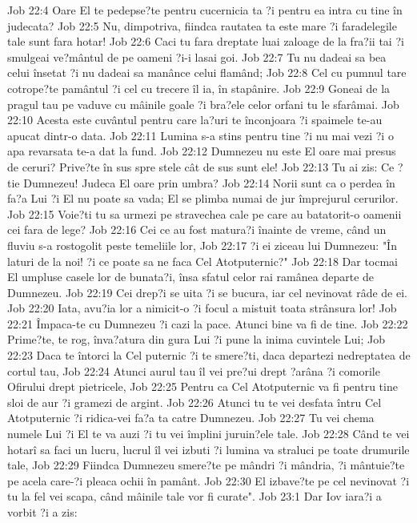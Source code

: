 Job 22:4  Oare El te pedepse?te pentru cucernicia ta ?i pentru ea intra cu tine în judecata?
Job 22:5  Nu, dimpotriva, fiindca rautatea ta este mare ?i faradelegile tale sunt fara hotar!
Job 22:6  Caci tu fara dreptate luai zaloage de la fra?ii tai ?i smulgeai ve?mântul de pe oameni ?i-i lasai goi.
Job 22:7  Tu nu dadeai sa bea celui însetat ?i nu dadeai sa manânce celui flamând;
Job 22:8  Cel cu pumnul tare cotrope?te pamântul ?i cel cu trecere îl ia, în stapânire.
Job 22:9  Goneai de la pragul tau pe vaduve cu mâinile goale ?i bra?ele celor orfani tu le sfarâmai.
Job 22:10  Acesta este cuvântul pentru care la?uri te înconjoara ?i spaimele te-au apucat dintr-o data.
Job 22:11  Lumina s-a stins pentru tine ?i nu mai vezi ?i o apa revarsata te-a dat la fund.
Job 22:12  Dumnezeu nu este El oare mai presus de ceruri? Prive?te în sus spre stele cât de sus sunt ele!
Job 22:13  Tu ai zis: Ce ?tie Dumnezeu! Judeca El oare prin umbra?
Job 22:14  Norii sunt ca o perdea în fa?a Lui ?i El nu poate sa vada; El se plimba numai de jur împrejurul cerurilor.
Job 22:15  Voie?ti tu sa urmezi pe stravechea cale pe care au batatorit-o oamenii cei fara de lege?
Job 22:16  Cei ce au fost matura?i înainte de vreme, când un fluviu s-a rostogolit peste temeliile lor,
Job 22:17  ?i ei ziceau lui Dumnezeu: "În laturi de la noi! ?i ce poate sa ne faca Cel Atotputernic?"
Job 22:18  Dar tocmai El umpluse casele lor de bunata?i, însa sfatul celor rai ramânea departe de Dumnezeu.
Job 22:19  Cei drep?i se uita ?i se bucura, iar cel nevinovat râde de ei.
Job 22:20  Iata, avu?ia lor a nimicit-o ?i focul a mistuit toata strânsura lor!
Job 22:21  Împaca-te cu Dumnezeu ?i cazi la pace. Atunci bine va fi de tine.
Job 22:22  Prime?te, te rog, înva?atura din gura Lui ?i pune la inima cuvintele Lui;
Job 22:23  Daca te întorci la Cel puternic ?i te smere?ti, daca departezi nedreptatea de cortul tau,
Job 22:24  Atunci aurul tau îl vei pre?ui drept ?arâna ?i comorile Ofirului drept pietricele,
Job 22:25  Pentru ca Cel Atotputernic va fi pentru tine sloi de aur ?i gramezi de argint.
Job 22:26  Atunci tu te vei desfata întru Cel Atotputernic ?i ridica-vei fa?a ta catre Dumnezeu.
Job 22:27  Tu vei chema numele Lui ?i El te va auzi ?i tu vei împlini juruin?ele tale.
Job 22:28  Când te vei hotarî sa faci un lucru, lucrul îl vei izbuti ?i lumina va straluci pe toate drumurile tale,
Job 22:29  Fiindca Dumnezeu smere?te pe mândri ?i mândria, ?i mântuie?te pe acela care-?i pleaca ochii în pamânt.
Job 22:30  El izbave?te pe cel nevinovat ?i tu la fel vei scapa, când mâinile tale vor fi curate".
Job 23:1  Dar Iov iara?i a vorbit ?i a zis:

